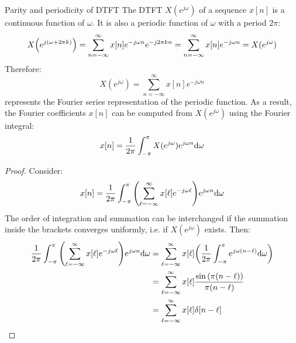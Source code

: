 \documentclass[../../main/main.tex]{subfiles}
\begin{document}
\begin{corollary}{Parity and periodicity of DTFT}{}
    The DTFT \( X(e^{j\omega}) \) of a sequence \( x[n] \) is a continuous function of \( \omega \).
    It is also a periodic function of \( \omega \) with a period \( 2\pi \):
    \begin{equation}
        X\qty(e^{j(\omega + 2\pi k)})
        =
        \sum_{n=-\infty}^{\infty} x[n] e^{-j\omega n} e^{-j 2\pi kn}
        =
        \sum_{n=-\infty}^{\infty} x[n] e^{-j\omega n}
        =
        X(e^{j\omega})
        \label{eq:L08_S25_1}
    \end{equation}
    Therefore:
    \begin{equation}
        X(e^{j\omega})
        =
        \sum_{n=-\infty}^{\infty} x[n] e^{-j\omega n}
        \label{eq:L08_S26_1}
    \end{equation}
    represents the Fourier series representation of the periodic function. As a result, the Fourier coefficients \( x[n] \) can be computed from \( X(e^{j\omega}) \) using the Fourier integral:
    \begin{equation}
        x[n]
        =
        \frac{1}{2\pi} \int_{-\pi}^{\pi} X(e^{j\omega}) e^{j\omega n} \mathrm{d}{\omega}
        \label{eq:L08_S26_2}
    \end{equation}
    \begin{proof}
        Consider:
        \begin{equation}
            x[n]
            =
            \frac{1}{2\pi} \int_{-\pi}^{\pi} \qty(\sum_{\ell=-\infty}^{\infty} x[\ell] e^{-j\omega \ell}) e^{j\omega n} \mathrm{d}{\omega}
            \label{eq:L08_S27_2}
        \end{equation}
        The order of integration and summation can be interchanged if the summation inside the brackets converges uniformly, i.e. if \( X(e^{j\omega}) \) exists. Then:
        \begin{align}
            \frac{1}{2\pi} \int_{-\pi}^{\pi} \qty(\sum_{\ell=-\infty}^{\infty} x[\ell] e^{-j\omega \ell}) e^{j\omega n} \d{\omega}
            &=
                \sum_{\ell=-\infty}^{\infty} x[\ell] \qty(\frac{1}{2\pi} \int_{-\pi}^{\pi} e^{j\omega (n-\ell)} \d{\omega}) \nonumber   \\
            &=
                \sum_{\ell=-\infty}^{\infty} x[\ell] \frac{\sin\qty(\pi(n-\ell))}{\pi (n-\ell)} \nonumber   \\
            &=
                \sum_{\ell=-\infty}^{\infty} x[\ell] \delta[n-\ell] \nonumber   \\

\end{align}
\end{proof}
\end{corollary}
\end{document}
